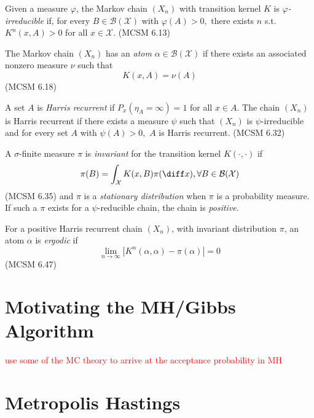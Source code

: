 \begin{definition}
    Given a measure $\varphi$, the Markov chain $(X_n)$ with transition kernel $K$ is \emph{$\varphi$-irreducible} if, for every $B\in\mathcal{B}(\mathcal{X})$ with $\varphi(A)>0,$ there exists $n$ s.t. $K^n(x, A)>0$ for all $x\in\mathcal{X}$. (MCSM 6.13)
\end{definition}

\begin{definition}[Atom]
    The Markov chain $(X_n)$ has an \emph{atom} ${\alpha\in\mathcal{B}(\mathcal{X})}$ if there exists an associated nonzero measure $\nu$ such that $$K(x, A) = \nu(A)$$ (MCSM 6.18)
\end{definition}

\begin{definition}
    A set $A$ is \emph{Harris recurrent} if $P_x(\eta_A = \infty) = 1$ for all $x\in A.$ The chain $(X_n)$ is Harris recurrent if there exists a measure $\psi$ such that $(X_n)$ is $\psi$-irreducible and for every set $A$ with $\psi(A) > 0,$ $A$ is Harris recurrent. (MCSM 6.32)
\end{definition}

\begin{definition}
    A $\sigma$-finite measure $\pi$ is \emph{invariant} for the transition kernel $K(\cdot,\cdot)$ if $$\pi(B) = \int_\mathcal{X} K(x, B)\pi(\diff x), \forall B\in\mathcal{B}(\mathcal{X})$$ (MCSM 6.35) and $\pi$ is a \emph{stationary distribution} when $\pi$ is a probability measure. If such a $\pi$ exists for a $\psi$-reducible chain, the chain is \emph{positive}.
\end{definition}

\begin{definition}[Ergodic]
    For a positive Harris recurrent chain $(X_n)$, with invariant distribution 
    $\pi$, an atom $\alpha$ is \emph{ergodic} if
    $$\lim_{n\to\infty}|K^n(\alpha, \alpha) - \pi(\alpha)| = 0$$ (MCSM 6.47)
\end{definition}

\color{black}

\section{Motivating the MH/Gibbs Algorithm}
\textcolor{red}{use some of the MC theory to arrive at the acceptance probability in MH}

\section{Metropolis Hastings}

